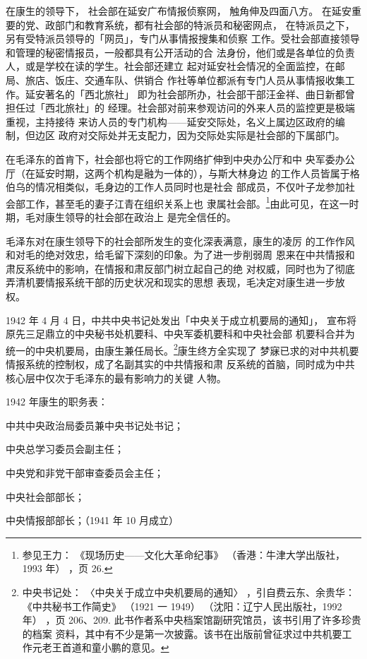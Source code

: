 在康生的领导下，
社会部在延安广布情报侦察网，
触角伸及四面八方。
在延安重要的党、政部门和教育系统，都有社会部的特派员和秘密网点，
在特派员之下，另有受特派员领导的「网员」，专门从事情报搜集和侦察
工作。受社会部直接领导和管理的秘密情报员，一般都具有公开活动的合
法身份，他们或是各单位的负责人，或是学校在读的学生。社会部还建立
起对延安社会情况的全面监控，在邮局、旅店、饭庄、交通车队、供销合
作社等单位都派有专门人员从事情报收集工作。延安著名的「西北旅社」
即为社会部所办，社会部干部汪金祥、曲日新都曾担任过「西北旅社」的
经理。社会部对前来参观访问的外来人员的监控更是极端重视，主持接待
来访人员的专门机构——延安交际处，名义上属边区政府的编制，但边区
政府对交际处并无支配力，因为交际处实际是社会部的下属部门。

在毛泽东的首肯下，社会部也将它的工作网络扩伸到中央办公厅和中
央军委办公厅（在延安时期，这两个机构是融为一体的），与斯大林身边
的工作人员皆属于格伯乌的情况相类似，毛身边的工作人员同时也是社会
部成员，不仅叶子龙参加社会部工作，甚至毛的妻子江青在组织关系上也
隶属社会部。\footnote{参见王力：
《现场历史——文化大革命纪事》
（香港：牛津大学出版社，1993 年）
，页 26.}由此可见，在这一时期，毛对康生领导的社会部在政治上
是完全信任的。

毛泽东对在康生领导下的社会部所发生的变化深表满意，康生的凌厉
的工作作风和对毛的绝对效忠，给毛留下深刻的印象。为了进一步削弱周
恩来在中共情报和肃反系统中的影响，在情报和肃反部门树立起自己的绝
对权威，同时也为了彻底弄清机要情报系统干部的历史状况和现实的思想
表现，毛决定对康生进一步放权。

1942 年 4 月 4 日，中共中央书记处发出「中央关于成立机要局的通知」，
宣布将原先三足鼎立的中央秘书处机要科、中央军委机要科和中央社会部
机要科合并为统一的中央机要局，由康生兼任局长。\footnote{中央书记处：
〈中央关于成立中央机要局的通知〉
，引自费云东、余贵华：
《中共秘书工作简史》
（1921 一 1949）
（沈阳：辽宁人民出版社，1992 年）
，页 206、209. 此书作者系中央档案馆副研究馆员，该书引用了许多珍贵的档案
资料，其中有不少是第一次披露。该书在出版前曾征求过中共机要工作元老王首道和童小鹏的意见。
}康生终方全实现了
梦寐已求的对中共机要情报系统的控制权，成了名副其实的中共情报和肃
反系统的首脑，同时成为中共核心层中仅次于毛泽东的最有影响力的关键
人物。

1942 年康生的职务表：

中共中央政治局委员兼中央书记处书记；

中央总学习委员会副主任；

中央党和非党干部审查委员会主任；

中央社会部部长；

中央情报部部长；（1941 年 10 月成立）


